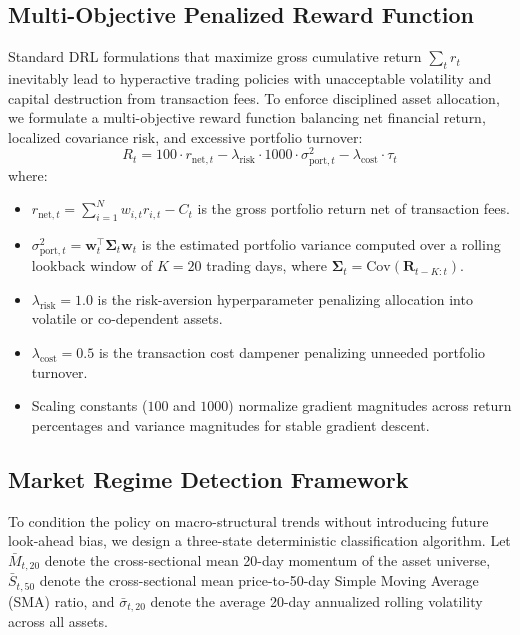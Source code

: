 \documentclass[conference]{IEEEtran}
\begin{document}
\subsection{Multi-Objective Penalized Reward Function}
Standard DRL formulations that maximize gross cumulative return $\sum_t r_t$ inevitably lead to hyperactive trading policies with unacceptable volatility and capital destruction from transaction fees. To enforce disciplined asset allocation, we formulate a multi-objective reward function balancing net financial return, localized covariance risk, and excessive portfolio turnover:
\begin{equation}
    R_t = 100 \cdot r_{\text{net}, t} - \lambda_{\text{risk}} \cdot 1000 \cdot \sigma_{\text{port}, t}^2 - \lambda_{\text{cost}} \cdot \tau_t
\end{equation}
where:
\begin{itemize}
    \item $r_{\text{net}, t} = \sum_{i=1}^N w_{i,t} r_{i,t} - C_t$ is the gross portfolio return net of transaction fees.
    \item $\sigma_{\text{port}, t}^2 = \mathbf{w}_t^\top \boldsymbol{\Sigma}_t \mathbf{w}_t$ is the estimated portfolio variance computed over a rolling lookback window of $K = 20$ trading days, where $\boldsymbol{\Sigma}_t = \text{Cov}(\mathbf{R}_{t-K:t})$.
    \item $\lambda_{\text{risk}} = 1.0$ is the risk-aversion hyperparameter penalizing allocation into volatile or co-dependent assets.
    \item $\lambda_{\text{cost}} = 0.5$ is the transaction cost dampener penalizing unneeded portfolio turnover.
    \item Scaling constants ($100$ and $1000$) normalize gradient magnitudes across return percentages and variance magnitudes for stable gradient descent.
\end{itemize}

\subsection{Market Regime Detection Framework}
To condition the policy on macro-structural trends without introducing future look-ahead bias, we design a three-state deterministic classification algorithm. Let $\bar{M}_{t, 20}$ denote the cross-sectional mean 20-day momentum of the asset universe, $\bar{S}_{t, 50}$ denote the cross-sectional mean price-to-50-day Simple Moving Average (SMA) ratio, and $\bar{\sigma}_{t, 20}$ denote the average 20-day annualized rolling volatility across all assets.
\end{document}
